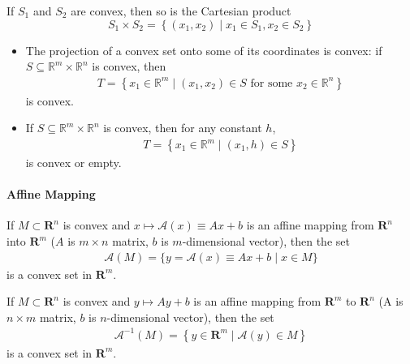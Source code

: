 \documentclass{article}
\begin{document}
If $S_{1}$ and $S_{2}$ are convex, then so is the Cartesian product
$$S_{1} \times S_{2}=\left\{\left(x_{1}, x_{2}\right) \mid x_{1} \in S_{1}, x_{2} \in S_{2}\right\}$$

\begin{itemize}
    \item The projection of a convex set onto some of its coordinates is convex: if $S \subseteq \mathbb{R}^{m} \times \mathbb{R}^{n}$ is convex, then
\begin{align*}
T=\left\{x_{1} \in \mathbb{R}^{m} \mid\left(x_{1}, x_{2}\right) \in S \text { for some } x_{2} \in \mathbb{R}^{n}\right\}
\end{align*}
is convex.
\item  If $S \subseteq \mathbb{R}^{m} \times \mathbb{R}^{n}$ is convex, then for any constant $h$,
\begin{align*}
T=\left\{x_{1} \in \mathbb{R}^{m} \mid\left(x_{1}, h\right) \in S\right\}
\end{align*}
is convex or empty.
\end{itemize}



\paragraph{Affine Mapping}


If $M \subset \mathbf{R}^{n}$ is convex and $x \mapsto \mathcal{A}(x) \equiv A x+b$ is an affine mapping from $\mathbf{R}^{n}$ into $\mathbf{R}^{m}$ ($A$ is $m \times n$ matrix, $b$ is $m$-dimensional vector), then the set
\begin{align*}
\mathcal{A}(M)=\{y=\mathcal{A}(x) \equiv A x+b \mid x \in M\}
\end{align*}
is a convex set in $\mathbf{R}^{m}$.



If $M \subset \mathbf{R}^{n}$ is convex and $y \mapsto A y+b$ is an affine mapping from $\mathbf{R}^{m}$ to $\mathbf{R}^{n}$ (A is $n \times m$ matrix, $b$ is $n$-dimensional vector), then the set
\begin{align*}
\mathcal{A}^{-1}(M)=\left\{y \in \mathbf{R}^{m} \mid \mathcal{A}(y) \in M\right\}
\end{align*}
is a convex set in $\mathbf{R}^{m}$.
\end{document}
